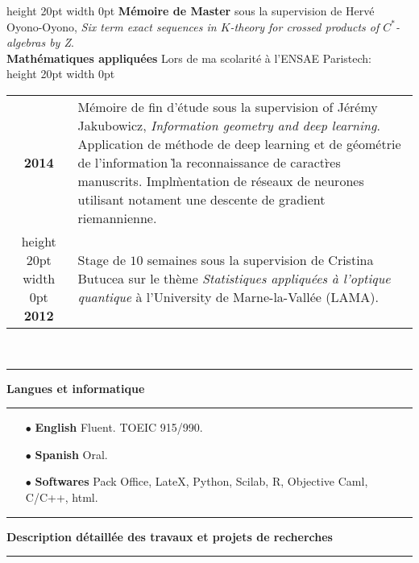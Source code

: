 \documentclass[a4paper,11pt]{article}
\newcommand\espace{\vrule height 20pt width 0pt}
\newcommand{\titre}[1]{%
	\begin{center}
	\bigskip
	\rule{\textwidth}{1pt}
	\par\vspace{0.1cm}
        \textbf{\large #1}
	\par\rule{\textwidth}{1pt}
	\end{center}
	\bigskip
	}
\begin{document}
\espace
\textbf{M\'emoire de Master} sous la supervision de Hervé Oyono-Oyono, \textit{Six term exact sequences in $K$-theory for crossed products of $C^*$-algebras by Z}.\\

\vfill
\textbf{Math\'ematiques appliqu\'ees} Lors de ma scolarit\'e \`a l'ENSAE Paristech:\\
\medskip
\espace
\begin{tabular}{cp{}}
\textbf{2014} & M\'emoire de fin d'\'etude sous la supervision of Jérémy Jakubowicz, \textit{Information geometry and deep learning}. Application de m\'ethode de deep learning et de g\'eom\'etrie de l'information \` la reconnaissance de caract\`res manuscrits. Impl\`mentation de r\'eseaux de neurones utilisant notament une descente de gradient riemannienne.\\
\espace
\textbf{2012}&  Stage de $10$ semaines sous la supervision de Cristina Butucea sur le th\`eme \textit{Statistiques appliqu\'ees \`a l'optique quantique} \`a l'University de Marne-la-Vallée (LAMA).		\\
\end{tabular}
\\


\titre{Langues et informatique}

\begin{itemize} 
\medskip
\item[$\bullet$] \textbf{English} Fluent. TOEIC 915/990.
\medskip
\item[$\bullet$] \textbf{Spanish} Oral.
\medskip
\item[$\bullet$] \textbf{Softwares} Pack Office, LateX, Python, Scilab, R, Objective Caml, C/C++, html.
\end{itemize}

\newpage

\titre{Description d\'etaill\'ee des travaux et projets de recherches}
\end{document}
